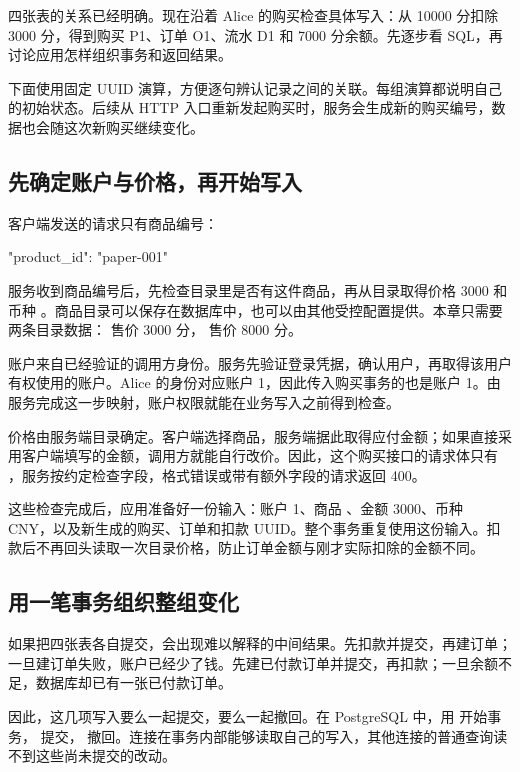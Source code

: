 四张表的关系已经明确。现在沿着 Alice 的购买检查具体写入：从 10000 分扣除 3000 分，得到购买 P1、订单 O1、流水 D1 和 7000 分余额。先逐步看 SQL，再讨论应用怎样组织事务和返回结果。

下面使用固定 UUID 演算，方便逐句辨认记录之间的关联。每组演算都说明自己的初始状态。后续从 HTTP 入口重新发起购买时，服务会生成新的购买编号，数据也会随这次新购买继续变化。

\subsection*{先确定账户与价格，再开始写入}

客户端发送的请求只有商品编号：

\begin{BookCode}
{"product_id": "paper-001"}
\end{BookCode}

服务收到商品编号后，先检查目录里是否有这件商品，再从目录取得价格 3000 和币种 。商品目录可以保存在数据库中，也可以由其他受控配置提供。本章只需要两条目录数据： 售价 3000 分， 售价 8000 分。

账户来自已经验证的调用方身份。服务先验证登录凭据，确认用户，再取得该用户有权使用的账户。Alice 的身份对应账户 1，因此传入购买事务的也是账户 1。由服务完成这一步映射，账户权限就能在业务写入之前得到检查。

价格由服务端目录确定。客户端选择商品，服务端据此取得应付金额；如果直接采用客户端填写的金额，调用方就能自行改价。因此，这个购买接口的请求体只有 ，服务按约定检查字段，格式错误或带有额外字段的请求返回 400。

这些检查完成后，应用准备好一份输入：账户 1、商品 、金额 3000、币种 CNY，以及新生成的购买、订单和扣款 UUID。整个事务重复使用这份输入。扣款后不再回头读取一次目录价格，防止订单金额与刚才实际扣除的金额不同。

\subsection*{用一笔事务组织整组变化}

如果把四张表各自提交，会出现难以解释的中间结果。先扣款并提交，再建订单；一旦建订单失败，账户已经少了钱。先建已付款订单并提交，再扣款；一旦余额不足，数据库却已有一张已付款订单。

因此，这几项写入要么一起提交，要么一起撤回。在 PostgreSQL 中，用  开始事务， 提交， 撤回。连接在事务内部能够读取自己的写入，其他连接的普通查询读不到这些尚未提交的改动。

